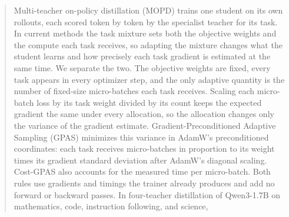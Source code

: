 \begin{abstract}

Multi-teacher on-policy distillation (MOPD) trains one student on its own
rollouts, each scored token by token by the specialist teacher for its task.
In current methods the task mixture sets both the objective weights and the
compute each task receives, so adapting the mixture changes what the student
learns and how precisely each task gradient is estimated at the same time. We
separate the two. The objective weights are fixed, every task appears in every
optimizer step, and the only adaptive quantity is the number of fixed-size
micro-batches each task receives. Scaling each micro-batch loss by its task
weight divided by its count keeps the expected gradient the same under every
allocation, so the allocation changes only the variance of the gradient
estimate. Gradient-Preconditioned Adaptive Sampling (GPAS) minimizes this
variance in AdamW's preconditioned coordinates: each task receives
micro-batches in proportion to its weight times its gradient standard
deviation after AdamW's diagonal scaling. Cost-GPAS also accounts for the
measured time per micro-batch. Both rules use gradients and timings the
trainer already produces and add no forward or backward passes. In
four-teacher distillation of Qwen3-1.7B on mathematics, code, instruction
following, and science, 

\end{abstract}
